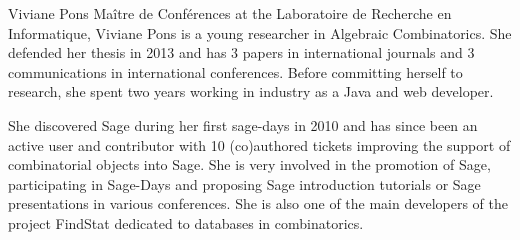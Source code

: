 \begin{picv}[PM=6,salary=4200]{Viviane Pons}
  Maître de Conférences at the Laboratoire de Recherche en Informatique, Viviane Pons is a
  young researcher in Algebraic Combinatorics. She defended her thesis in 2013 and has 3
  papers in international journals and 3 communications in international
  conferences. Before committing herself to research, she spent two years working in
  industry as a Java and web developer.

  She discovered Sage during her first sage-days in 2010 and has since been an active user
  and contributor with 10 (co)authored tickets improving the support of combinatorial
  objects into Sage. She is very involved in the promotion of Sage, participating in
  Sage-Days and proposing Sage introduction tutorials or Sage presentations in various
  conferences.  She is also one of the main developers of the project FindStat dedicated
  to databases in combinatorics.
\end{picv}
